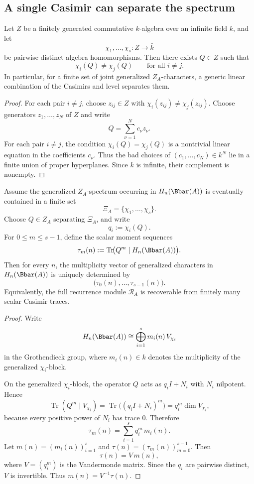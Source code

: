 \subsection{A single Casimir can separate the spectrum}

\begin{lemma}
\ClaimStatusProvedHere
\label{lem:generic-separator}
Let \(Z\) be a finitely generated commutative \(k\)-algebra over an infinite field \(k\), and let
\[
\chi_1,\dots,\chi_s\colon Z\to \bar{k}
\]
be pairwise distinct algebra homomorphisms.
Then there exists \(Q\in Z\) such that
\[
\chi_i(Q)\neq \chi_j(Q)\qquad\text{for all }i\neq j.
\]
In particular, for a finite set of joint generalized \(Z_A\)-characters, a generic linear combination of the Casimirs and level separates them.
\end{lemma}

\begin{proof}
For each pair \(i\neq j\), choose \(z_{ij}\in Z\) with \(\chi_i(z_{ij})\neq \chi_j(z_{ij})\).
Choose generators \(z_1,\dots,z_N\) of \(Z\) and write
\[
Q=\sum_{\nu=1}^N c_\nu z_\nu.
\]
For each pair \(i\neq j\), the condition \(\chi_i(Q)=\chi_j(Q)\) is a nontrivial linear equation in the coefficients \(c_\nu\).
Thus the bad choices of \((c_1,\dots,c_N)\in k^N\) lie in a finite union of proper hyperplanes.
Since \(k\) is infinite, their complement is nonempty.
\end{proof}

\begin{theorem}
\ClaimStatusProvedHere
\label{thm:casimir-moment-reconstruction}
Assume the generalized \(Z_A\)-spectrum occurring in \(H_n(\Bbar(A))\) is eventually contained in a finite set
\[
\Xi_A=\{\chi_1,\dots,\chi_s\}.
\]
Choose \(Q\in Z_A\) separating \(\Xi_A\), and write
\[
q_i:=\chi_i(Q).
\]
For \(0\le m\le s-1\), define the scalar moment sequences
\[
\tau_m(n):=\operatorname{Tr}\!\bigl(Q^m\mid H_n(\Bbar(A))\bigr).
\]
Then for every \(n\), the multiplicity vector of generalized characters in \(H_n(\Bbar(A))\) is uniquely determined by
\[
\bigl(\tau_0(n),\dots,\tau_{s-1}(n)\bigr).
\]
Equivalently, the full recurrence module \(\mathcal R_A\) is recoverable from finitely many scalar Casimir traces.
\end{theorem}

\begin{proof}
Write
\[
H_n(\Bbar(A))\cong \bigoplus_{i=1}^s m_i(n)\,V_{\chi_i}
\]
in the Grothendieck group, where \(m_i(n)\in k\) denotes the multiplicity of the generalized \(\chi_i\)-block.

On the generalized \(\chi_i\)-block, the operator \(Q\) acts as \(q_i I + N_i\) with \(N_i\) nilpotent.
Hence
\[
\operatorname{Tr}(Q^m\mid V_{\chi_i})
=\operatorname{Tr}\bigl((q_iI+N_i)^m\bigr)
= q_i^m \dim V_{\chi_i},
\]
because every positive power of \(N_i\) has trace \(0\).
Therefore
\[
\tau_m(n)=\sum_{i=1}^s q_i^m\,m_i(n).
\]
Let \(m(n)=(m_i(n))_{i=1}^s\) and \(\tau(n)=(\tau_m(n))_{m=0}^{s-1}\).
Then
\[
\tau(n)=V\,m(n),
\]
where \(V=(q_i^m)\) is the Vandermonde matrix.
Since the \(q_i\) are pairwise distinct, \(V\) is invertible.
Thus \(m(n)=V^{-1}\tau(n)\).
\end{proof}

